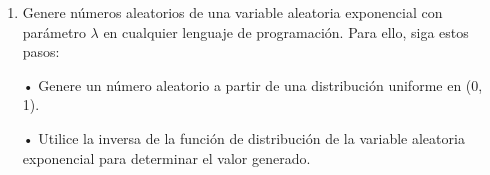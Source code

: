 \documentclass[a4paper, 12pt]{article}
\newcommand{\Aspace}{0.2cm}
\begin{document}
\begin{enumerate}
        \item Genere números aleatorios de una variable aleatoria exponencial con parámetro $\lambda$ en cualquier lenguaje de programación. Para ello, siga estos pasos: \par
        • Genere un número aleatorio a partir de una distribución uniforme en (0, 1). \par
        • Utilice la inversa de la función de distribución de la variable aleatoria exponencial para determinar el valor generado.
            \vspace{\Aspace} \par
            { \color{azul}  }
    \end{enumerate}
\end{document}
